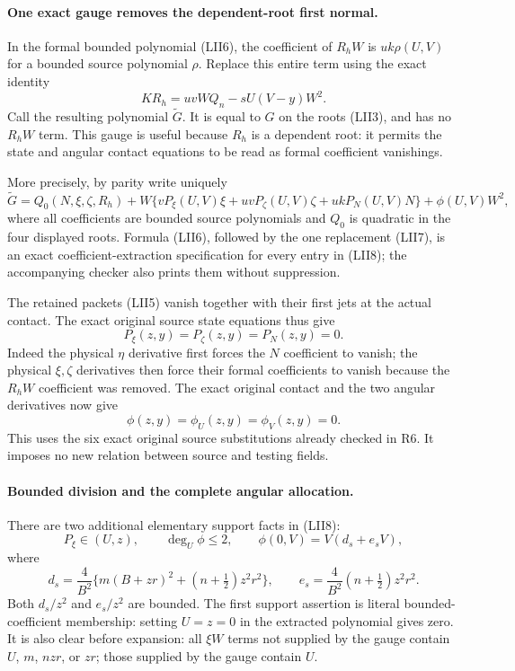 \paragraph{One exact gauge removes the dependent-root first normal.}
In the formal bounded polynomial (LII6), the coefficient of $R_hW$
is $uk\rho(U,V)$ for a bounded source polynomial $\rho$.  Replace
this entire term using the exact identity
\[
 KR_h=uvWQ_n-sU(V-y)W^2.                         \tag{LII7}
\]
Call the resulting polynomial $\widetilde G$.  It is equal to $G$
on the roots (LII3), and has no $R_hW$ term.  This gauge is useful
because $R_h$ is a dependent root: it permits the state and angular
contact equations to be read as formal coefficient vanishings.

More precisely, by parity write uniquely
\[
 \widetilde G=Q_0(N,\xi,\zeta,R_h)
 +W\{vP_\xi(U,V)\xi+uvP_\zeta(U,V)\zeta
                         +ukP_N(U,V)N\}
 +\phi(U,V)W^2,                                  \tag{LII8}
\]
where all coefficients are bounded source polynomials and $Q_0$ is
quadratic in the four displayed roots.  Formula (LII6), followed by
the one replacement (LII7), is an exact coefficient-extraction
specification for every entry in (LII8); the accompanying checker
also prints them without suppression.

The retained packets (LII5) vanish together with their first jets at
the actual contact.  The exact original source state equations thus
give
\[
 P_\xi(z,y)=P_\zeta(z,y)=P_N(z,y)=0.              \tag{LII9}
\]
Indeed the physical $\eta$ derivative first forces the $N$ coefficient
to vanish; the physical $\xi,\zeta$ derivatives then force their
formal coefficients to vanish because the $R_hW$ coefficient was
removed.  The exact original contact and the two angular derivatives
now give
\[
 \phi(z,y)=\phi_U(z,y)=\phi_V(z,y)=0.              \tag{LII10}
\]
This uses the six exact original source substitutions already checked
in R6.  It imposes no new relation between source and testing fields.

\paragraph{Bounded division and the complete angular allocation.}
There are two additional elementary support facts in (LII8):
\[
 P_\xi\in(U,z),\qquad \deg_U\phi\leq2,\qquad
 \phi(0,V)=V(d_s+e_sV),                           \tag{LII11}
\]
where
\[
 d_s=\frac4{B^2}\{m(B+zr)^2+(n+\tfrac12)z^2r^2\},\qquad
 e_s=\frac4{B^2}(n+\tfrac12)z^2r^2.
\]
Both $d_s/z^2$ and $e_s/z^2$ are bounded.  The first support assertion
is literal bounded-coefficient membership: setting $U=z=0$ in the
extracted polynomial gives zero.  It is also clear before expansion:
all $\xi W$ terms not supplied by the gauge contain $U$, $m$, $nzr$,
or $zr$; those supplied by the gauge contain $U$.

